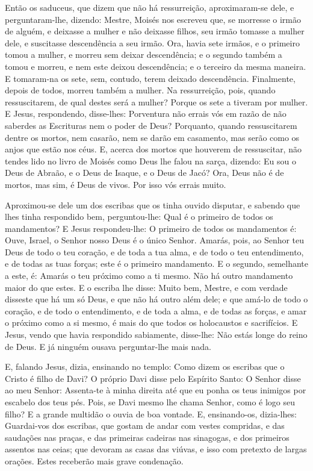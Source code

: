 Então os saduceus, que dizem que não há ressurreição,
aproximaram-se dele, e perguntaram-lhe, dizendo: Mestre,
Moisés nos escreveu que, se morresse o irmão de alguém, e deixasse a
mulher e não deixasse filhos, seu irmão tomasse a mulher dele, e
suscitasse descendência a seu irmão. Ora, havia sete irmãos,
e o primeiro tomou a mulher, e morreu sem deixar descendência;
e o segundo também a tomou e morreu, e nem este deixou
descendência; e o terceiro da mesma maneira. E tomaram-na os
sete, sem, contudo, terem deixado descendência. Finalmente, depois
de todos, morreu também a mulher. Na ressurreição, pois,
quando ressuscitarem, de qual destes será a mulher? Porque os sete a
tiveram por mulher. E Jesus, respondendo, disse-lhes:
Porventura não errais vós em razão de não saberdes as Escrituras nem
o poder de Deus? Porquanto, quando ressuscitarem dentre os
mortos, nem casarão, nem se darão em casamento, mas serão como os
anjos que estão nos céus. E, acerca dos mortos que houverem
de ressuscitar, não tendes lido no livro de Moisés como Deus lhe
falou na sarça, dizendo: Eu sou o Deus de Abraão, e o Deus de
Isaque, e o Deus de Jacó? Ora, Deus não é de mortos, mas sim,
é Deus de vivos. Por isso vós errais muito.

Aproximou-se dele um dos escribas que os tinha ouvido disputar, e
sabendo que lhes tinha respondido bem, perguntou-lhe: Qual é o
primeiro de todos os mandamentos? E Jesus respondeu-lhe: O
primeiro de todos os mandamentos é: Ouve, Israel, o Senhor nosso
Deus é o único Senhor. Amarás, pois, ao Senhor teu Deus de
todo o teu coração, e de toda a tua alma, e de todo o teu
entendimento, e de todas as tuas forças; este é o primeiro
mandamento. E o segundo, semelhante a este, é: Amarás o teu
próximo como a ti mesmo. Não há outro mandamento maior do que estes.
E o escriba lhe disse: Muito bem, Mestre, e com verdade
disseste que há um só Deus, e que não há outro além dele; e
que amá-lo de todo o coração, e de todo o entendimento, e de toda a
alma, e de todas as forças, e amar o próximo como a si mesmo, é mais
do que todos os holocaustos e sacrifícios. E Jesus, vendo que
havia respondido sabiamente, disse-lhe: Não estás longe do reino de
Deus. E já ninguém ousava perguntar-lhe mais nada.

E, falando Jesus, dizia, ensinando no templo: Como dizem os
escribas que o Cristo é filho de Davi? O próprio Davi disse
pelo Espírito Santo: O Senhor disse ao meu Senhor: Assenta-te à
minha direita até que eu ponha os teus inimigos por escabelo dos
teus pés. Pois, se Davi mesmo lhe chama Senhor, como é logo
seu filho? E a grande multidão o ouvia de boa vontade. E,
ensinando-os, dizia-lhes: Guardai-vos dos escribas, que gostam de
andar com vestes compridas, e das saudações nas praças, e das
primeiras cadeiras nas sinagogas, e dos primeiros assentos nas
ceias; que devoram as casas das viúvas, e isso com pretexto
de largas orações. Estes receberão mais grave condenação.


